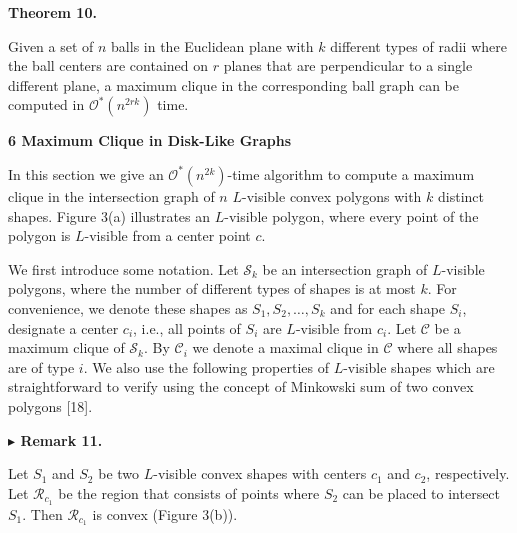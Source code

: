 \par
\par
\par\medskip\noindent\textbf{Theorem 10.}\par
Given a set of $n$ balls in the Euclidean plane with $k$ different types of radii where the ball centers are contained on $r$ planes that are perpendicular to a single different plane, a maximum clique in the corresponding ball graph can be computed in $\mathcal{O}^{*}(n^{2rk})$ time.
\par
\par
\par
\par
\par
\par\medskip\noindent\textbf{6 Maximum Clique in Disk-Like Graphs}\par
In this section we give an $\mathcal{O}^{*}(n^{2k})$-time algorithm to compute a maximum clique in the intersection graph of $n$ $L$-visible convex polygons with $k$ distinct shapes. Figure 3(a) illustrates an $L$-visible polygon, where every point of the polygon is $L$-visible from a center point $c$.
\par
\par
We first introduce some notation. Let $\mathcal{S}_{k}$ be an intersection graph of $L$-visible polygons, where the number of different types of shapes is at most $k$. For convenience, we denote these shapes as $S_{1},S_{2},\ldots,S_{k}$ and for each shape $S_{i}$, designate a center $c_{i}$, i.e., all points of $S_{i}$ are $L$-visible from $c_{i}$. Let $\mathcal{C}$ be a maximum clique of $\mathcal{S}_{k}$. By $\mathcal{C}_{i}$ we denote a maximal clique in $\mathcal{C}$ where all shapes are of type $i$. We also use the following properties of $L$-visible shapes which are straightforward to verify using the concept of Minkowski sum of two convex polygons [18].
\par
\par
\par\medskip\noindent\textbf{$\blacktriangleright$ Remark 11.}\par
Let $S_{1}$ and $S_{2}$ be two $L$-visible convex shapes with centers $c_{1}$ and $c_{2}$, respectively. Let $\mathcal{R}_{c_{1}}$ be the region that consists of points where $S_{2}$ can be placed to intersect $S_{1}$. Then $\mathcal{R}_{c_{1}}$ is convex (Figure 3(b)).
\par
\par
\par
